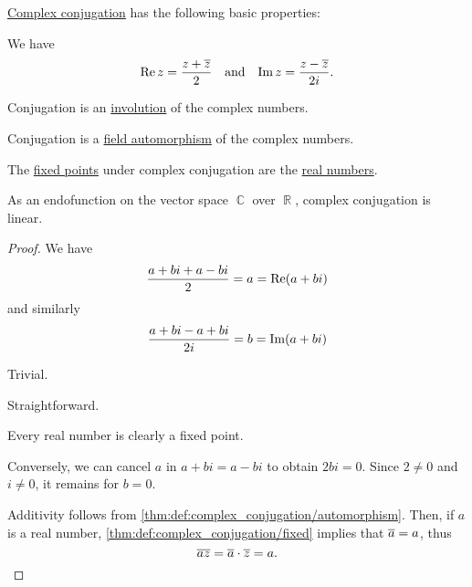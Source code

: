 \begin{proposition}\label{thm:def:complex_conjugation}
  \hyperref[def:complex_conjugation]{Complex conjugation} has the following basic properties:
  \begin{thmenum}
     We have
    \begin{align*}
      \real z = \frac {z + \oline z} 2
      &&\T{and}&&
      \imag z = \frac {z - \oline z} {2i}.
    \end{align*}

     Conjugation is an \hyperref[def:morphism_invertibility/involution]{involution} of the complex numbers.

     Conjugation is a \hyperref[def:field/homomorphism]{field automorphism} of the complex numbers.

     The \hyperref[def:function_fixed_point]{fixed points} under complex conjugation are the \hyperref[def:real_numbers]{real numbers}.

     As an endofunction on the vector space \( \BbbC \) over \( \BbbR \), complex conjugation is linear.
  \end{thmenum}
\end{proposition}
\begin{proof}
   We have
  \begin{equation*}
    \frac {a + bi + a - bi} 2 = a = \operatorname{Re}(a + bi)
  \end{equation*}
  and similarly
  \begin{equation*}
    \frac {a + bi - a + bi} {2i} = b = \operatorname{Im}(a + bi)
  \end{equation*}

   Trivial.

   Straightforward.

   Every real number is clearly a fixed point.

  Conversely, we can cancel \( a \) in \( a + bi = a - bi \) to obtain \( 2bi = 0 \). Since \( 2 \neq 0 \) and \( i \neq 0 \), it remains for \( b = 0 \).

   Additivity follows from \cref{thm:def:complex_conjugation/automorphism}. Then, if \( a \) is a real number, \cref{thm:def:complex_conjugation/fixed} implies that \( \oline a = a \), thus
  \begin{equation*}
    \oline {az} = \oline a \cdot \oline z = a.
  \end{equation*}
\end{proof}

